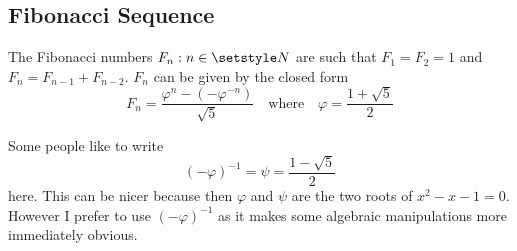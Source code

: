\subsection{Fibonacci Sequence}

\begin{theorem}
 The Fibonacci numbers \(F_n: n \in \Naturals\) are such that
 \(F_1 = F_2 = 1\) and \(F_n = F_{n - 1} + F_{n - 2}\).  \(F_n\) can be given
 by the closed form
 \begin{equation*}
  F_n = \frac{\varphi^n - (-\varphi^{-n})}{\sqrt 5}
  \quad \text{where}\quad \varphi = \frac{1 + \sqrt 5} 2
 \end{equation*}
\end{theorem}
Some people like to write
\begin{equation*}
 (-\varphi)^{-1} = \psi = \frac{1 - \sqrt 5}2
\end{equation*}
here. This can be nicer because then \(\varphi\) and \(\psi\) are the two
roots of \(x^2 - x - 1 = 0\). However I prefer to use \((-\varphi)^{-1}\) as
it makes some algebraic manipulations more immediately obvious.
